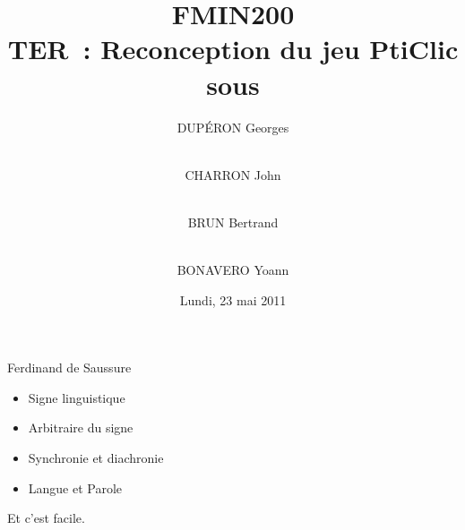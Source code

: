 \documentclass{beamer}
\title{FMIN200 \\ TER~: Reconception du jeu PtiClic sous \android{}}
\author{DUPÉRON Georges \and\\ CHARRON John \and\\ BRUN Bertrand \and\\ BONAVERO Yoann}
\institute{Université Montpellier II, Département informatique}
\date{Lundi, 23 mai 2011}
\begin{document}
\begin{frame}
  \titlepage
\end{frame}

\begin{frame}
  
  Ferdinand de Saussure
  \begin{itemize}
  \item Signe linguistique
  \item Arbitraire du signe
  \item Synchronie et diachronie
  \item Langue et Parole
  \end{itemize}
  
  
\end{frame}

\begin{frame}
  Et c'est facile.
\end{frame}
\end{document}
